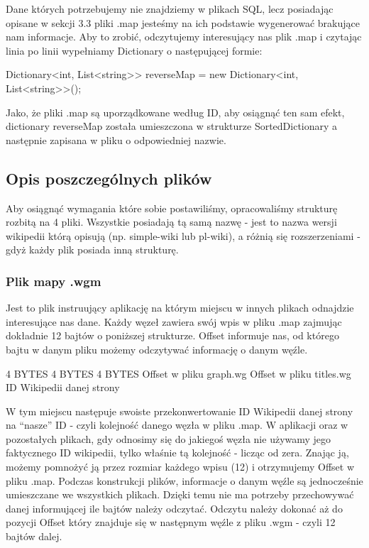 Dane których potrzebujemy nie znajdziemy w plikach SQL, lecz posiadając opisane w sekcji 3.3 pliki .map jesteśmy na ich podstawie wygenerować brakujące nam informacje.
Aby to zrobić, odczytujemy interesujący nas plik .map i czytając linia po linii wypełniamy Dictionary o następującej formie:

Dictionary<int, List<string>> reverseMap = new Dictionary<int, List<string>>();

Jako, że pliki .map są uporządkowane według ID, aby osiągnąć ten sam efekt, dictionary reverseMap została umieszczona w strukturze SortedDictionary a następnie zapisana w pliku o odpowiedniej nazwie.

\subsection{Opis poszczególnych plików}
Aby osiągnąć wymagania które sobie postawiliśmy, opracowaliśmy strukturę rozbitą na 4 pliki. Wszystkie posiadają tą samą nazwę - jest to nazwa wersji wikipedii którą opisują (np. simple-wiki lub pl-wiki), a różnią się rozszerzeniami - gdyż każdy plik posiada inną strukturę.

\subsubsection{Plik mapy .wgm}
Jest to plik instruujący aplikację na którym miejscu w innych plikach odnajdzie interesujące nas dane.
Każdy węzeł zawiera swój wpis w pliku .map zajmując dokładnie 12 bajtów o poniższej strukturze. Offset informuje nas, od którego bajtu w danym pliku możemy odczytywać informację o danym węźle.


4 BYTES
4 BYTES
4 BYTES
Offset w pliku graph.wg
Offset w pliku titles.wg
ID Wikipedii danej strony

W tym miejscu następuje swoiste przekonwertowanie ID Wikipedii danej strony na “nasze” ID - czyli kolejność danego węzła w pliku .map. W aplikacji oraz w pozostałych plikach, gdy odnosimy się do jakiegoś węzła nie używamy jego faktycznego ID wikipedii, tylko właśnie tą kolejność - licząc od zera. Znając ją, możemy pomnożyć ją przez rozmiar każdego wpisu (12) i otrzymujemy Offset w pliku .map.
Podczas konstrukcji plików, informacje o danym węźle są jednocześnie umieszczane we wszystkich plikach. Dzięki temu nie ma potrzeby przechowywać danej informującej ile bajtów należy odczytać. Odczytu należy dokonać aż do pozycji Offset który znajduje się w następnym węźle z pliku .wgm - czyli 12 bajtów dalej.

